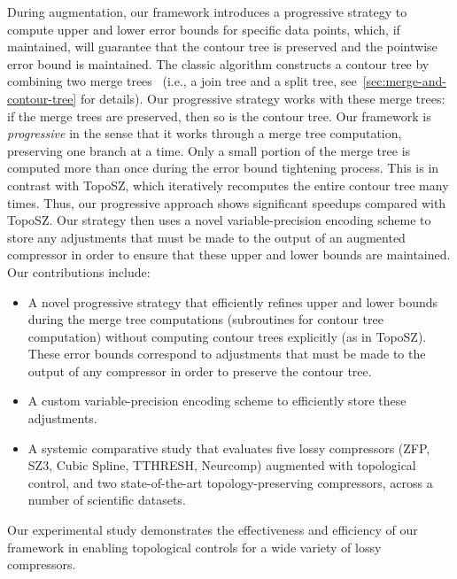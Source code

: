 During augmentation, our framework introduces a progressive strategy to compute upper and lower error bounds for specific data points, which, if maintained, will guarantee that the contour tree is preserved and the pointwise error bound is maintained. 
The classic algorithm constructs a contour tree by combining two merge trees~\cite{carr2003computing} (i.e., a join tree and a split tree, see~\cref{sec:merge-and-contour-tree} for details).  
Our progressive strategy works with these merge trees: if the merge trees are preserved, then so is the contour tree.
Our framework is \emph{progressive} in the sense that it works through a merge tree computation, preserving one branch at a time. 
Only a small portion of the merge tree is computed more than once during the error bound tightening process.
This is in contrast with TopoSZ, which iteratively recomputes the entire contour tree many times. Thus, our progressive approach shows significant speedups compared with TopoSZ.
Our strategy then uses a novel variable-precision encoding scheme to store any adjustments that must be made to the output of an augmented compressor in order to ensure that these upper and lower bounds are maintained.  
Our contributions include: 
\begin{itemize}[noitemsep,leftmargin=*]
\item A novel progressive strategy that efficiently refines upper and lower bounds during the merge tree computations (subroutines for contour tree computation) without computing contour trees explicitly (as in TopoSZ). These error bounds correspond to adjustments that must be made to the output of any compressor in order to preserve the contour tree.   
\item A custom variable-precision encoding scheme to efficiently store these adjustments.
\item A systemic comparative study that evaluates five lossy compressors (ZFP, SZ3, Cubic Spline, TTHRESH, Neurcomp) augmented with topological control, and two state-of-the-art topology-preserving compressors, across a number of scientific datasets.  
\end{itemize}
Our experimental study demonstrates the effectiveness and efficiency of our framework in enabling topological controls for a wide variety of lossy compressors.